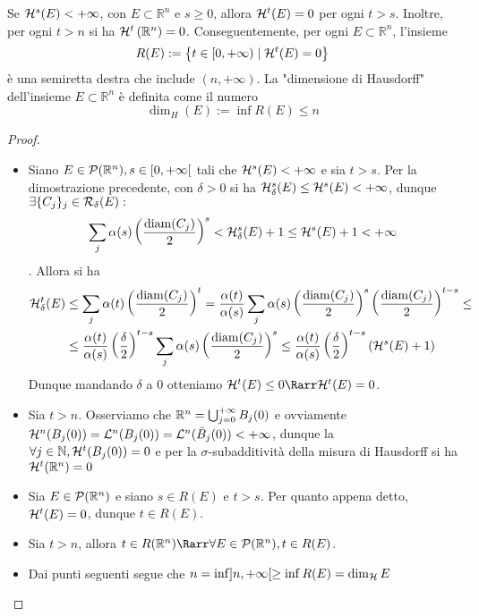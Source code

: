 \begin{proposition}[$*$]\label{prop: 1.4 dimensione Hausdorff} Se $\mathcal{H}^{s}(E)<+\infty$, con $E \subset \mathbb{R}^{n}$ e $s \geq 0$, allora $\mathcal{H}^{t}(E)=0$ per ogni $t>s$. Inoltre, per ogni $t>n$ si ha $\mathcal{H}^{t}\left(\mathbb{R}^{n}\right)=0$. Conseguentemente, per ogni $E \subset \mathbb{R}^{n}$, l'insieme
\[
R(E):=\left\{t \in[0,+\infty) \mid \mathcal{H}^{t}(E)=0\right\}
\]
è una semiretta destra che include $(n,+\infty)$. La "dimensione di Hausdorff" dell'insieme $E \subset \mathbb{R}^{n}$ è definita come il numero
\[
\operatorname{dim}_{H}(E):=\inf R(E) \leq n
\]
\end{proposition}
\begin{proof}
  \begin{itemize}
      \item Siano $E \in \mathcal{P}(\mathbb{R}^n), s \in [0,+\infty[$ tali che $\mathcal{H}^s(E) < +\infty$ e sia $t>s$. Per la dimostrazione precedente, con $\delta > 0$ si ha $\mathcal{H}_{\delta}^s(E) \leq \mathcal{H}^s(E) < +\infty$, dunque $\exists \{C_j\}_j \in \mathcal{R}_\delta(E):$ \[\sum_j \alpha(s) \left(\frac{\operatorname{diam}(C_j)}{2}\right)^s < \mathcal{H}_{\delta}^s(E) +1 \leq \mathcal{H}^s(E) + 1 < +\infty\]. Allora si ha 
      \[\begin{aligned}\mathcal{H}_{\delta}^t(E) &\leq \sum_j \alpha(t) \left(\frac{\operatorname{diam}(C_j)}{2}\right)^t = \frac{\alpha(t)}{\alpha(s)}\sum_j \alpha(s) \left(\frac{\operatorname{diam}(C_j)}{2}\right)^s \left(\frac{\operatorname{diam}(C_j)}{2}\right)^{t-s} \leq \\ &\leq\frac{\alpha(t)}{\alpha(s)} \left(\frac{\delta}{2}\right)^{t-s}\sum_j \alpha(s) \left(\frac{\operatorname{diam}(C_j)}{2}\right)^s \leq  \frac{\alpha(t)}{\alpha(s)} \left(\frac{\delta}{2}\right)^{t-s} (\mathcal{H}^s(E) + 1)\end{aligned}\] Dunque mandando $\delta$ a $0$ otteniamo $\mc H^t(E) \leq 0 \Rarr \mc H^t(E) = 0$.
      \item Sia $t>n$. Osserviamo che $\mathbb{R}^n = \bigcup_{j=0}^{+\infty} B_j(0)$ e ovviamente $\mathcal{H}^n (B_j(0)) = \mathcal{L}^n(B_j(0)) = \mathcal{L}^n(\bar{B}_j(0)) < +\infty$, dunque la $\forall j \in \mathbb{N}, \mathcal{H}^t(B_j(0)) = 0$ e per la $\sigma$-subadditività della misura di Hausdorff si ha $\mathcal{H}^t(\mathbb{R}^n) = 0$ 
      \item Sia $E \in \mathcal{P}(\mathbb{R}^n)$ e siano $s \in R(E)$ e $t>s$. Per quanto appena detto, $\mathcal{H}^t(E) = 0$, dunque $t \in R(E)$.
      \item Sia $t > n$, allora $t \in R(\R^n) \Rarr \forall E \in \mc P(\R^n), t \in R(E)$.
      \item Dai punti seguenti segue che $n = \inf]n,+\infty[ \geq \inf R(E) = \dim_{\mathcal{H}} E$
  \end{itemize}
\end{proof}

